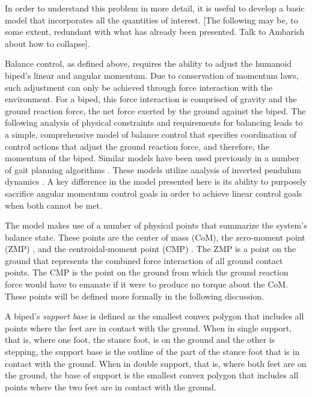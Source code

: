 \documentclass{llncs}
\begin{document}


In order to understand this problem in more detail, it is useful to develop a basic model that incorporates
all the quantities of interest.
[The following may be, to some extent, redundant with what has already been presented.
Talk to Ambarish about how to collapse].



Balance control, as defined above, requires the ability to adjust the humanoid biped’s linear and angular momentum.  
Due to conservation of momentum laws, such adjustment can only be achieved through force interaction with the environment.  
For a biped, this force interaction is comprised of gravity and the ground reaction force, the net force exerted by the ground against the biped.  
The following analysis of physical constraints and requirements for balancing leads to a simple, comprehensive model of balance control that specifies 
coordination of control actions that adjust the ground reaction force, and therefore, the momentum of the biped.
Similar models have been used previously in a number of gait planning algorithms 
\cite{kajita2001real, yokoi2001honda, sugihara2002real, nishiwaki2002online}.
These models utilize analysis of inverted pendulum dynamics \cite{formal2006inverted}.
A key difference in the model presented here is its ability to 
purposely sacrifice angular momentum control goals in order to achieve linear control goals when both cannot be met.  

The model makes use of a number of physical points that summarize the system’s balance state.  
These points are the center of mass (CoM), the zero-moment point (ZMP) \cite{vukobratovic69},
and the centroidal-moment point (CMP) \cite{popovic2005ground}.  
The ZMP is a point on the ground that represents the combined force interaction of all ground contact points.  
The CMP is the point on the ground from which the ground reaction force would have to emanate if it were to produce no torque about the CoM. 
These points will be defined more formally in the following discussion.

A biped’s \textit{support base} is defined as the smallest convex polygon that includes all points where the feet are in contact with the ground.  
When in single support, that is, where one foot, the stance foot, is on the ground and the other is stepping, the support base is the outline of the part of 
the stance foot that is in contact with the ground.  
When in double support, that is, where both feet are on the ground, the base of support is the smallest convex polygon that includes all points where the two feet are in 
contact with the ground.  
\end{document}
